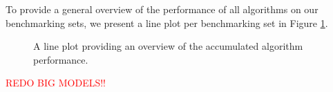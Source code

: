 To provide a general overview of the performance of all algorithms on our benchmarking sets, we present a line plot per benchmarking set in Figure \ref{fig:AlgoPerformance}.
\begin{figure}[h!]
    \centering
    \qquad
    \qquad
    \caption[Overview of Algorithm Performance]{
        A line plot providing an overview of the accumulated algorithm performance.
        }%
    \label{fig:AlgoPerformanceBig}
    \label{fig:AlgoPerformance}
\end{figure}
\textcolor{red}{REDO BIG MODELS!!}

